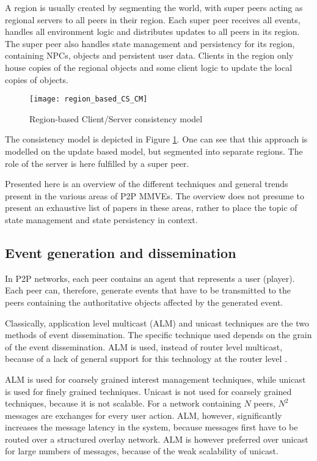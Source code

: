 A region is usually created by segmenting the world, with super peers acting as regional servers to all peers in their region. Each super peer receives all events, handles all environment logic and distributes updates to all peers in its region. The super peer also handles state management and persistency for its region, containing NPCs, objects and persistent user data. Clients in the region only house copies of the regional objects and some client logic to update the local copies of objects.

\begin{figure}[htbp]
 \centering
 \texttt{[image: region\_based\_CS\_CM]}
 \caption{Region-based Client/Server consistency model}
 \label{fig_cs_region_cm}
\end{figure}
%
The consistency model is depicted in Figure \ref{fig_cs_region_cm}. One can see that this approach is modelled on the update based model, but segmented into separate regions. The role of the server is here fulfilled by a super peer.

Presented here is an overview of the different techniques and general trends present in the various areas of P2P MMVEs. The overview does not presume to present an exhaustive list of papers in these areas, rather to place the topic of state management and state persistency in context.


\subsection{Event generation and dissemination}

In P2P networks, each peer contains an agent that represents a user (player). Each peer can, therefore, generate events that have to be transmitted to the peers containing the authoritative objects affected by the generated event.

Classically, application level multicast (ALM) and unicast techniques are the two methods of event dissemination. The specific technique used depends on the grain of the event dissemination. ALM is used, instead of router level multicast, because of a lack of general support for this technology at the router level \cite{ip_multicast_deployment_issues}.

ALM is used for coarsely grained interest management techniques, while unicast is used for finely grained techniques. Unicast is not used for coarsely grained techniques, because it is not scalable. For a network containing $N$ peers, $N^2$ messages are exchanges for every user action. ALM, however, significantly increases the message latency in the system, because messages first have to be routed over a structured overlay network. ALM is however preferred over unicast for large numbers of messages, because of the weak scalability of unicast.

